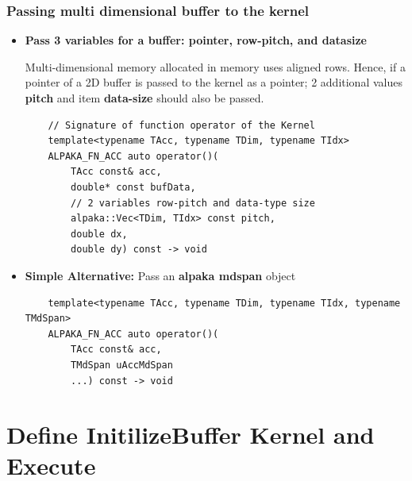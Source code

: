 \documentclass[9pt]{beamer}
\begin{document}
\begin{frame}[fragile]
\small
\frametitle{Passing multi dimensional buffer to the kernel}
 \begin{itemize}
 \item \textbf{Pass 3 variables for a buffer: pointer, row-pitch, and datasize}

Multi-dimensional memory allocated in memory uses aligned rows.
Hence, if a pointer of a 2D buffer is passed to the kernel as a pointer; 2 additional values \textbf{pitch} and item \textbf{data-size} should also be passed.

        \lstset{basicstyle=\ttfamily\scriptsize}
        \begin{lstlisting}
    // Signature of function operator of the Kernel
    template<typename TAcc, typename TDim, typename TIdx>
    ALPAKA_FN_ACC auto operator()(
        TAcc const& acc,
        double* const bufData,
        // 2 variables row-pitch and data-type size
        alpaka::Vec<TDim, TIdx> const pitch,
        double dx,
        double dy) const -> void
        \end{lstlisting}

        \hspace{-0.2\baselineskip}


\item \textbf{Simple Alternative:} Pass an \textbf{alpaka mdspan} object
\lstset{basicstyle=\ttfamily\scriptsize}
\begin{lstlisting}
    template<typename TAcc, typename TDim, typename TIdx, typename TMdSpan>
    ALPAKA_FN_ACC auto operator()(
        TAcc const& acc,
        TMdSpan uAccMdSpan
        ...) const -> void
\end{lstlisting}
\end{itemize}
\end{frame}



\section{Define InitilizeBuffer Kernel and Execute}
\end{document}
